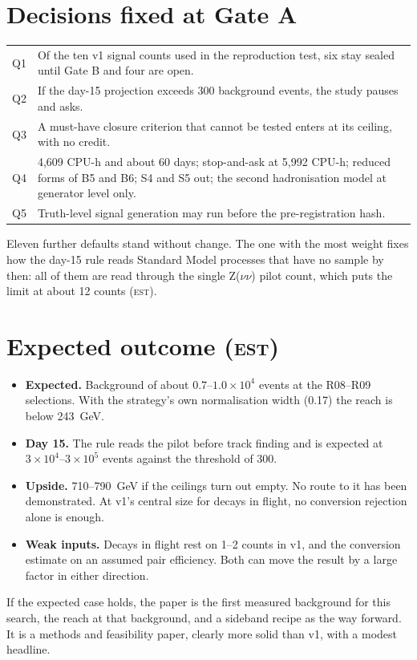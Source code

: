 \documentclass[11pt,a4paper]{article}
\newcommand{\est}{\textsc{est}}
\begin{document}
\section{Decisions fixed at Gate A}
\begin{center}
\begin{tabular}{L{1.0cm}L{13.2cm}}
\toprule
Q1 & Of the ten v1 signal counts used in the reproduction test, six stay sealed until Gate B and four are open. \\
Q2 & If the day-15 projection exceeds 300 background events, the study pauses and asks. \\
Q3 & A must-have closure criterion that cannot be tested enters at its ceiling, with no credit. \\
Q4 & 4{,}609 CPU-h and about 60 days; stop-and-ask at 5{,}992 CPU-h; reduced forms of B5 and B6; S4 and S5 out;
     the second hadronisation model at generator level only. \\
Q5 & Truth-level signal generation may run before the pre-registration hash. \\
\bottomrule
\end{tabular}
\end{center}
Eleven further defaults stand without change. The one with the most weight fixes how the day-15 rule reads
Standard Model processes that have no sample by then: all of them are read through the single Z($\nu\nu$) pilot
count, which puts the limit at about 12 counts (\est).

\section{Expected outcome (\est)}
\begin{itemize}
\item \textbf{Expected.} Background of about $0.7$--$1.0\times10^{4}$ events at the R08--R09 selections. With
      the strategy's own normalisation width (0.17) the reach is below 243~GeV.
\item \textbf{Day 15.} The rule reads the pilot before track finding and is expected at
      $3\times10^{4}$--$3\times10^{5}$ events against the threshold of 300.
\item \textbf{Upside.} 710--790~GeV if the ceilings turn out empty. No route to it has been demonstrated. At v1's
      central size for decays in flight, no conversion rejection alone is enough.
\item \textbf{Weak inputs.} Decays in flight rest on 1--2 counts in v1, and the conversion estimate on an assumed
      pair efficiency. Both can move the result by a large factor in either direction.
\end{itemize}
If the expected case holds, the paper is the first measured background for this search, the reach at that
background, and a sideband recipe as the way forward. It is a methods and feasibility paper, clearly more solid
than v1, with a modest headline.
\end{document}
